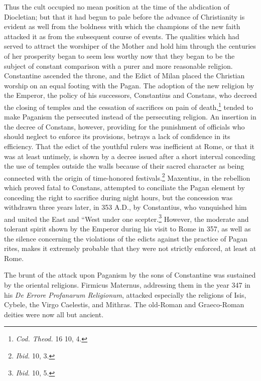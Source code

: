 \documentclass[a4paper, 11pt, oneside, polutonikogreek, english]{article}
\begin{document}
Thus the cult occupied no mean position at the time of the abdication of Diocletian; but that it had begun to pale before the advance of Christianity is evident as well from the boldness with which the champions of the new faith attacked it as from the subsequent course of events. The qualities which had served to attract the worshiper of the Mother and hold him through the centuries of her prosperity began to seem less worthy now that they began to be the subject of constant comparison with a purer and more reasonable religion. Constantine ascended the throne, and the Edict of Milan placed the Christian worship on an equal footing with the Pagan. The adoption of the new religion by the Emperor, the policy of his successors, Constantius and Constans, who decreed the closing of temples and the cessation of sacrifices on pain of death,\footnote{\emph{Cod. Theod.} 16 10, 4.} tended to make Paganism the persecuted instead of the persecuting religion. An insertion in the decree of Constans, however, providing for the punishment of officials who should neglect to enforce its provisions, betrays a lack of confidence in its efficiency. That the edict of the youthful rulers was inefficient at Rome, or that it was at least untimely, is shown by a decree issued after a short interval conceding the use of temples outside the walls because of their sacred character as being connected with the origin of time-honored festivals.\footnote{\emph{Ibid.} 10, 3.} Maxentius, in the rebellion which proved fatal to Constans, attempted to conciliate the Pagan element by conceding the right to sacrifice during night hours, but the concession was withdrawn three years later, in 353 \textsc{A.D.}, by Constantius, who vanquished him and united the East and ``West under one scepter.\footnote{\emph{Ibid.} 10, 5.} However, the moderate and tolerant spirit shown by the Emperor during his visit to Rome in 357, as well as the silence concerning the violations of the edicts against the practice of Pagan rites, makes it extremely probable that they were not strictly enforced, at least at Rome.

The brunt of the attack upon Paganism by the sons of Constantine was sustained by the oriental religions. Firmicus Maternus, addressing them in the year 347 in his \emph{De Errore Profanarum Religionum}, attacked especially the religions of Isis, Cybele, the Virgo Caelestis, and Mithras. The old-Roman and Graeco-Roman deities were now all but ancient.
\end{document}
